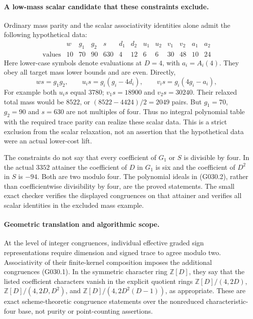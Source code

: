 \paragraph{A low-mass scalar candidate that these constraints exclude.}
Ordinary mass parity and the scalar associativity
identities alone admit the following hypothetical data:
\[
 \begin{array}{c|rrrrrrrrrrrr}
 &w&g_1&g_2&s&d_1&d_2&u_1&u_2&v_1&v_2&a_1&a_2\\\hline
 \text{values}&10&70&90&630&4&12&6&6&30&48&10&24
 \end{array}
\]
Here lower-case symbols denote evaluations at $D=4$,
with $a_i=A_i(4)$. They obey all target mass lower
bounds and are even. Directly,
\[
 ws=g_1g_2,
 \qquad u_i s=g_i(g_i-4d_i),\qquad
 v_i s=g_i(4g_i-a_i),
\]
For example both $u_i s$ equal $3780$;
$v_1s=18900$ and $v_2s=30240$.
Their relaxed total mass would be $8522$, or
$(8522-4424)/2=2049$ pairs. But $g_1=70$, $g_2=90$
and $s=630$ are not multiples of four. Thus no integral
polynomial table with the required trace parity can
realize these scalar data. This is a strict exclusion
from the scalar relaxation, not an assertion that the
hypothetical data were an actual lower-cost lift.

The constraints do not say that every coefficient
of $G_1$ or $S$ is divisible by four. In the actual
$3352$ attainer the coefficient of $D$ in $G_1$
is six and the coefficient of $D^2$ in $S$ is
$-94$. Both are two modulo four. The polynomial
ideals in (G030.2), rather than coefficientwise
divisibility by four, are the proved statements.
The small exact checker verifies the displayed
congruences on that attainer and verifies all scalar
identities in the excluded mass example.

\paragraph{Geometric translation and algorithmic scope.}
At the level of integer congruences, individual effective
graded sign representations require dimension and signed
trace to agree modulo two.
Associativity of their finite-kernel composition imposes
the additional congruences (G030.1). In the symmetric
character ring $\mathbb Z[D]$, they say that the listed
coefficient characters vanish in the explicit quotient
rings $\mathbb Z[D]/(4,2D)$,
$\mathbb Z[D]/(4,2D,D^2)$, and
$\mathbb Z[D]/(4,2D^2(D-1))$, as appropriate.
These are exact scheme-theoretic congruence statements
over the nonreduced characteristic-four base, not
purity or point-counting assertions.

